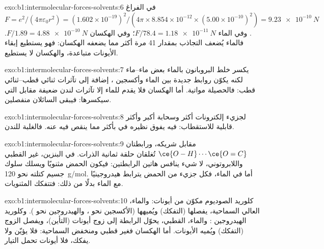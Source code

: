 \begin{solution}{exo:b1:intermolecular-forces-solvents:6}
في الفراغ $F = e^2/(4\pi\varepsilon_0 r^2) = (1.602 \times
10^{-19})^2/(4\pi \times 8.854 \times 10^{-12} \times (5.00 \times
10^{-10})^2) = \qty{9.23e-10}{N}$. وفي الماء $F/78.4 = \qty{1.18e-11}{N}$؛
وفي الهكسان $F/1.89 = \qty{4.88e-10}{N}$. فالماء يُضعف التجاذب بمقدار 41
مرة أكثر مما يضعفه الهكسان: فهو يستطيع إبقاء الأيونات متباعدة، والهكسان لا يستطيع.
\end{solution}

\begin{solution}{exo:b1:intermolecular-forces-solvents:7}
يكسر خلط البروبانون بالماء بعض  ماء--ماء لكنه
يكوّن روابط جديدة بين الماء وأكسجين ، إضافة إلى
تآثرات ثنائي قطب--ثنائي قطب: فالحصيلة مواتية. أما الهكسان فلا يقدم
للماء إلا تآثرات لندن ضعيفة مقابل  التي
سيكسرها: فيبقى السائلان منفصلين.
\end{solution}

\begin{solution}{exo:b1:intermolecular-forces-solvents:8}
لجزيء  إلكترونات أكثر وسحابة أكبر وأكثر قابلية للاستقطاب:  فيه يفوق نظيره في  بأكثر مما ينقص 
فيه عنه. فالغلبة للندن.
\end{solution}

\begin{solution}{exo:b1:intermolecular-forces-solvents:9}
 مقابل شريكه، ورابطتان
$\ce{O-H}\cdots\ce{O=C}$ تُغلقان حلقة ثمانية الذرات. في البنزين،
غير القطبي واللابروتوني، لا شيء ينافس هاتين الرابطتين: فيكون الحمض
مثنويًا ويسلك سلوك جسيم كتلته نحو \qty{120}{g/mol}. أما في الماء،
فكل جزيء من الحمض يترابط هيدروجينيًا مع الماء بدلًا من ذلك: فتتفكك المثنويات.
\end{solution}

\begin{solution}{exo:b1:intermolecular-forces-solvents:10}
كلوريد الصوديوم مكوّن من أيونات: والماء، العالي السماحية، يفصلها
(التفكك) ويُميهها (الأكسجين نحو ، والهيدروجين
نحو ). وكلوريد الهيدروجين : والماء، القطبي،
يحوّل الرابطة  إلى زوج أيونات  (التأين)،
ويفصل الزوج (التفكك) ويُميه الأيونات. أما الهكسان فغير قطبي
ومنخفض السماحية: فلا يؤيّن ولا يفكك، فلا أيونات
تحمل التيار.
\end{solution}

